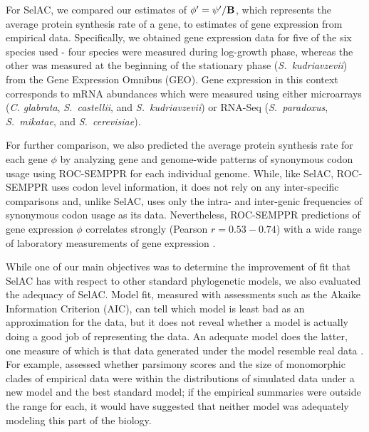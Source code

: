 \documentclass[12pt,letterpaper,fleqn]{article}
\newcommand{\Func}{\ensuremath{\text{\textbf{B}}}\xspace}
\newcommand{\selac}{SelAC\xspace}
\newcommand{\phiprime}{\ensuremath{\phi^\prime}\xspace}
\newcommand{\psiprime}{\ensuremath{\psi^\prime}\xspace}
\begin{document}
For \selac, we compared our estimates of $\phiprime = \psiprime/\Func$, which represents the average protein synthesis rate of a gene, to estimates of gene expression from empirical data.
Specifically, we obtained gene expression data for five of the six species used - four species were measured during log-growth phase, whereas the other was measured at the beginning of the stationary phase (\emph{S.~kudriavzevii}) from the Gene Expression Omnibus (GEO).
Gene expression in this context corresponds to mRNA abundances which were measured using either microarrays (\emph{C. glabrata}, \emph{S.~castellii}, and \emph{S.~kudriavzevii}) or RNA-Seq (\emph{S.~paradoxus}, \emph{S.~mikatae}, and \emph{S.~cerevisiae}).

For further comparison, we also predicted the average protein synthesis rate for each gene $\phi$ by analyzing gene and genome-wide patterns of synonymous codon usage using ROC-SEMPPR \citep{GilchristEtAl2015} for each individual genome.
While, like \selac, ROC-SEMPPR uses codon level information, it does not rely on any inter-specific comparisons and, unlike \selac, uses only the intra- and inter-genic frequencies of synonymous codon usage as its data.
Nevertheless, ROC-SEMPPR predictions of gene expression $\phi$ correlates strongly (Pearson $r= 0.53-0.74$) with a wide range of laboratory measurements of gene expression \citep{GilchristEtAl2015}.

While one of our main objectives was to determine the improvement of fit that \selac has with respect to other standard phylogenetic models, we also evaluated the adequacy of \selac.
Model fit, measured with assessments such as the Akaike Information Criterion (AIC), can tell which model is least bad as an approximation for the data, but it does not reveal whether a model is actually doing a good job of representing the data. %
An adequate model does the latter, one measure of which is that data generated under the model resemble real data \citep{goldman1993statistical}.
For example, \citet{BeaulieuEtAl2013} assessed whether parsimony scores and the size of monomorphic clades of empirical data were within the distributions of simulated data under a new model and the best standard model; if the empirical summaries were outside the range for each, it would have suggested that neither model was adequately modeling this part of the biology.
\end{document}
